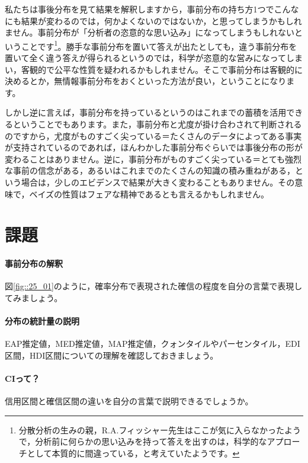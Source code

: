 \documentclass{ltjbook}
\begin{document}
私たちは事後分布を見て結果を解釈しますから，事前分布の持ち方1つでこんなにも結果が変わるのでは，何かよくないのではないか，と思ってしまうかもしれません。事前分布が「分析者の恣意的な思い込み」になってしまうもしれないということです\footnote{分散分析の生みの親，R.A.フィッシャー先生はここが気に入らなかったようで，分析前に何らかの思い込みを持って答えを出すのは，科学的なアプローチとして本質的に間違っている，と考えていたようです。}。勝手な事前分布を置いて答えが出たとしても，違う事前分布を置いて全く違う答えが得られるというのでは，科学が恣意的な営みになってしまい，客観的で公平な性質を疑われるかもしれません。そこで事前分布は客観的に決めるとか，無情報事前分布をおくといった方法が良い，ということになります。

しかし逆に言えば，事前分布を持っているというのはこれまでの蓄積を活用できるということでもあります。また，事前分布と尤度が掛け合わされて判断されるのですから，尤度がものすごく尖っている＝たくさんのデータによってある事実が支持されているのであれば，ほんわかした事前分布ぐらいでは事後分布の形が変わることはありません。逆に，事前分布がものすごく尖っている＝とても強烈な事前の信念がある，あるいはこれまでのたくさんの知識の積み重ねがある，という場合は，少しのエビデンスで結果が大きく変わることもありません。その意味で，ベイズの性質はフェアな精神であるとも言えるかもしれません。


\section{課題}
\paragraph{事前分布の解釈}図\ref{fig::25_01}のように，確率分布で表現された確信の程度を自分の言葉で表現してみましょう。
\paragraph{分布の統計量の説明}EAP推定値，MED推定値，MAP推定値，クォンタイルやパーセンタイル，EDI区間，HDI区間についての理解を確認しておきましょう。
\paragraph{CIって？}信用区間と確信区間の違いを自分の言葉で説明できるでしょうか。
\end{document}
